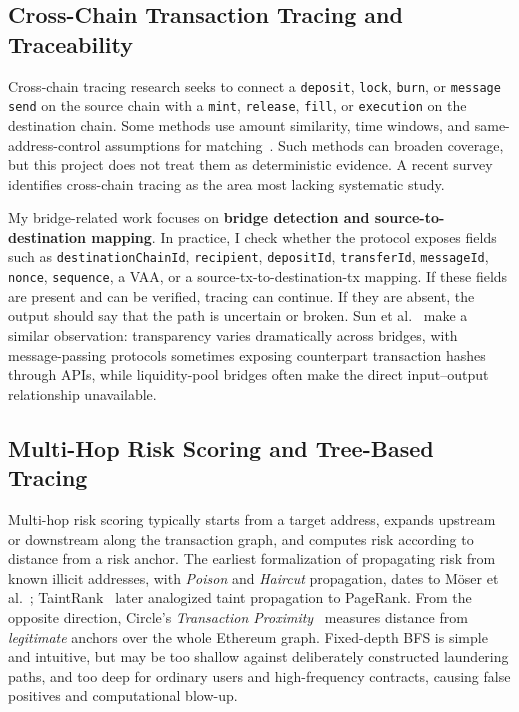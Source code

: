 \documentclass[12pt,a4paper]{article}
\begin{document}
\subsection{Cross-Chain Transaction Tracing and Traceability}

Cross-chain tracing research seeks to connect a \texttt{deposit}, \texttt{lock}, \texttt{burn}, or \texttt{message send} on the source chain with a \texttt{mint}, \texttt{release}, \texttt{fill}, or \texttt{execution} on the destination chain. Some methods use amount similarity, time windows, and same-address-control assumptions for matching~\cite{mazorra2023,sun2025track}. Such methods can broaden coverage, but this project does not treat them as deterministic evidence. A recent survey~\cite{ren2025survey} identifies cross-chain tracing as the area most lacking systematic study.

My bridge-related work focuses on \textbf{bridge detection and source-to-destination mapping}. In practice, I check whether the protocol exposes fields such as \texttt{destinationChainId}, \texttt{recipient}, \texttt{depositId}, \texttt{transferId}, \texttt{messageId}, \texttt{nonce}, \texttt{sequence}, a VAA, or a source-tx-to-destination-tx mapping. If these fields are present and can be verified, tracing can continue. If they are absent, the output should say that the path is uncertain or broken. Sun et al.~\cite{sun2025track} make a similar observation: transparency varies dramatically across bridges, with message-passing protocols sometimes exposing counterpart transaction hashes through APIs, while liquidity-pool bridges often make the direct input--output relationship unavailable.

\subsection{Multi-Hop Risk Scoring and Tree-Based Tracing}

Multi-hop risk scoring typically starts from a target address, expands upstream or downstream along the transaction graph, and computes risk according to distance from a risk anchor. The earliest formalization of propagating risk from known illicit addresses, with \textit{Poison} and \textit{Haircut} propagation, dates to M\"{o}ser et al.~\cite{moser2014}; TaintRank~\cite{hercog2019} later analogized taint propagation to PageRank. From the opposite direction, Circle's \textit{Transaction Proximity}~\cite{liao2025} measures distance from \emph{legitimate} anchors over the whole Ethereum graph. Fixed-depth BFS is simple and intuitive, but may be too shallow against deliberately constructed laundering paths, and too deep for ordinary users and high-frequency contracts, causing false positives and computational blow-up.
\end{document}
